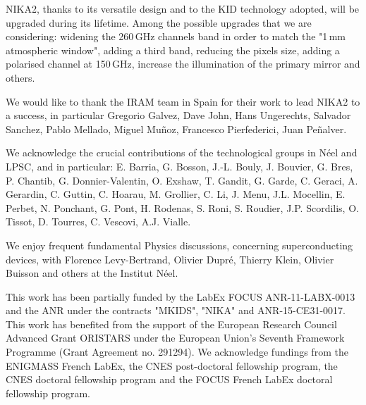 \documentclass[]{aa} %
\begin{document}
NIKA2, thanks to its versatile design and to the KID technology adopted, will be upgraded during its lifetime. Among the possible upgrades that we are considering: widening the 260\,GHz channels band in order to match the "1\,mm atmospheric window", adding a third band, reducing the pixels size, adding a polarised channel at 150\,GHz, increase the illumination of the primary mirror and others. 



\begin{acknowledgements}
We would like to thank the IRAM team in Spain for their work to lead NIKA2 to a success, in particular Gregorio Galvez, Dave John, Hans Ungerechts, Salvador Sanchez, Pablo Mellado, Miguel Mu\~noz, Francesco Pierfederici, Juan Pe\~nalver.

We acknowledge the crucial contributions of the technological groups in N\'eel and LPSC, and in particular: E. Barria, G. Bosson, J.-L. Bouly, J. Bouvier, G. Bres, P. Chantib, G. Donnier-Valentin,  O. Exshaw, T. Gandit, G. Garde, C. Geraci, A. Gerardin, C. Guttin, C. Hoarau, M. Grollier, C. Li, J. Menu, J.L. Mocellin, E. Perbet, N. Ponchant, G. Pont, H. Rodenas, S. Roni, S. Roudier, J.P. Scordilis, O. Tissot, D. Tourres, C. Vescovi, A.J. Vialle. 

We enjoy frequent fundamental Physics discussions, concerning superconducting devices, with Florence Levy-Bertrand, Olivier Dupr\'e, Thierry Klein, Olivier Buisson and others at the Institut N\'eel.

This work has been partially funded by the LabEx FOCUS ANR-11-LABX-0013 and 
the ANR under the contracts "MKIDS", "NIKA" and ANR-15-CE31-0017. 
This work has benefited from the support of the European Research Council Advanced Grant ORISTARS under the European Union's Seventh Framework Programme (Grant Agreement no. 291294). We acknowledge fundings from the ENIGMASS French LabEx, 
the CNES post-doctoral fellowship program,  the CNES doctoral fellowship program and the FOCUS French LabEx doctoral fellowship program.


\end{acknowledgements}


%
%


%
% 
\end{document}
